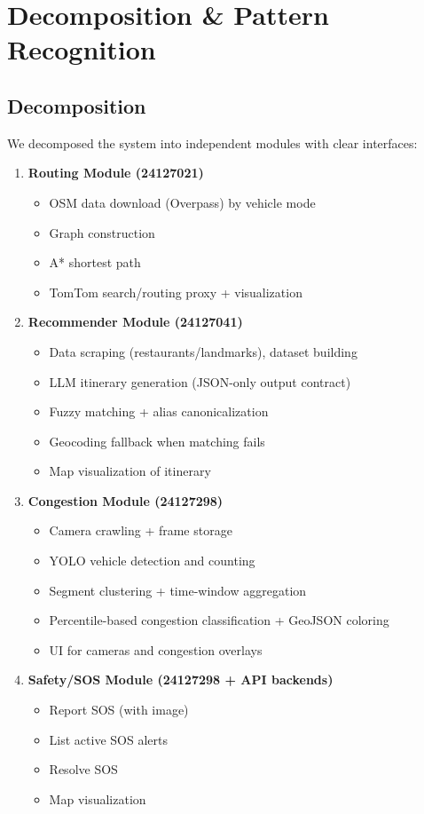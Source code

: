 \section{Decomposition \& Pattern Recognition}

\subsection{Decomposition}
We decomposed the system into independent modules with clear interfaces:
\begin{enumerate}
  \item \textbf{Routing Module (24127021)}
  \begin{itemize}
    \item OSM data download (Overpass) by vehicle mode
    \item Graph construction
    \item A* shortest path
    \item TomTom search/routing proxy + visualization
  \end{itemize}

  \item \textbf{Recommender Module (24127041)}
  \begin{itemize}
    \item Data scraping (restaurants/landmarks), dataset building
    \item LLM itinerary generation (JSON-only output contract)
    \item Fuzzy matching + alias canonicalization
    \item Geocoding fallback when matching fails
    \item Map visualization of itinerary
  \end{itemize}

  \item \textbf{Congestion Module (24127298)}
  \begin{itemize}
    \item Camera crawling + frame storage
    \item YOLO vehicle detection and counting
    \item Segment clustering + time-window aggregation
    \item Percentile-based congestion classification + GeoJSON coloring
    \item UI for cameras and congestion overlays
  \end{itemize}

  \item \textbf{Safety/SOS Module (24127298 + API backends)}
  \begin{itemize}
    \item Report SOS (with image)
    \item List active SOS alerts
    \item Resolve SOS
    \item Map visualization
  \end{itemize}


\end{enumerate}
